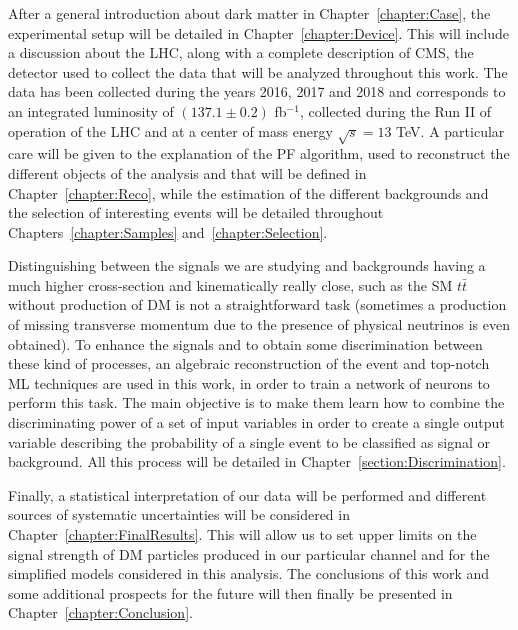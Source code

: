 \documentclass[a4paper, 10pt, openright]{report}
\begin{document}
After a general introduction about dark matter in Chapter~\ref{chapter:Case}, the experimental setup will be detailed in Chapter~\ref{chapter:Device}. This will include a discussion about the \ac{LHC}, along with a complete description of \ac{CMS}, the detector used to collect the data that will be analyzed throughout this work. The data has been collected during the years 2016, 2017 and 2018 and corresponds to an integrated luminosity of $(137.1 \pm 0.2)$ fb$^{-1}$, collected during the Run II of operation of the \ac{LHC} and at a center of mass energy $\sqrt{s} = 13$ TeV. A particular care will be given to the explanation of the \acf{PF} algorithm, used to reconstruct the different objects of the analysis and that will be defined in Chapter~\ref{chapter:Reco}, while the estimation of the different backgrounds and the selection of interesting events will be detailed throughout Chapters~\ref{chapter:Samples} and~\ref{chapter:Selection}.

Distinguishing between the signals we are studying and backgrounds having a much higher cross-section and kinematically really close, such as the \ac{SM} $t \bar t$ without production of \ac{DM} is not a straightforward task (sometimes a production of missing transverse momentum due to the presence of physical neutrinos is even obtained). To enhance the signals and to obtain some discrimination between these kind of processes, an algebraic reconstruction of the event and top-notch \ac{ML} techniques are used in this work, in order to train a network of neurons to perform this task. The main objective is to make them learn how to combine the discriminating power of a set of input variables in order to create a single output variable describing the probability of a single event to be classified as signal or background. All this process will be detailed in Chapter~\ref{section:Discrimination}.

Finally, a statistical interpretation of our data will be performed and different sources of systematic uncertainties will be considered in Chapter~\ref{chapter:FinalResults}. This will allow us to set upper limits on the signal strength of \ac{DM} particles produced in our particular channel and for the simplified models considered in this analysis. The conclusions of this work and some additional prospects for the future will then finally be presented in Chapter~\ref{chapter:Conclusion}.


\clearpage
\thispagestyle{empty}
\phantom{a}
\vfill
\newpage
\end{document}
